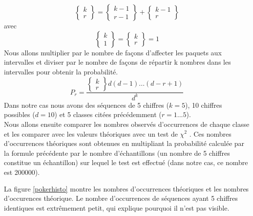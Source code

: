 \documentclass[10pt,a4paper]{article}
\begin{document}
\begin{equation*}
\begin{Bmatrix}
k\\
r
\end{Bmatrix}
=
\begin{Bmatrix}
k-1\\
r-1
\end{Bmatrix}
+
\begin{Bmatrix}
k-1\\
r
\end{Bmatrix}
\end{equation*}
avec 
\begin{equation*}
\begin{Bmatrix}
k\\
1
\end{Bmatrix}
=
\begin{Bmatrix}
k\\
r
\end{Bmatrix}
=
1
\end{equation*}
Nous allons multiplier par le nombre de façons d'affecter les paquets aux intervalles et diviser par le nombre de façons de répartir k nombres dans les intervalles pour obtenir la probabilité.\\
\begin{equation*}
P_r = 
\frac{\begin{Bmatrix}
k\\
r
\end{Bmatrix}d(d-1) ...(d-r+1)}{d^k}
\end{equation*}
\newline
Dans notre cas nous avons des séquences de 5 chiffres ($k=5$), 10 chiffres possibles ($d=10$) et 5 classes citées précédemment ($r = 1...5$).\\
Nous allons ensuite comparer les nombres observés d'occurrences de chaque classe et les comparer avec les valeurs théoriques avec un test de $\chi^2$ . Ces nombres d'occurrences théoriques sont obtenues en multipliant la probabilité calculée par la formule précédente par le nombre d'échantillons (un nombre de 5 chiffres constitue un échantillon) sur lequel le test est effectué (dans notre cas, ce nombre est 200000). \newline

La figure \ref{pokerhisto} montre les nombres d'occurrences théoriques et les nombres d'occurences théorique. Le nombre d'occurrences de séquences ayant 5 chiffres identiques est extrêmement petit, qui explique pourquoi il n'est pas visible.\\
\end{document}
